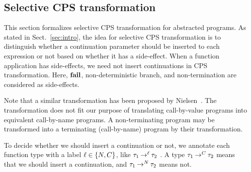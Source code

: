 \subsection{Selective CPS transformation}
\label{sec:CPS}

This section formalizes selective CPS transformation for abstracted
programs.  As stated in Sect.~\ref{sec:intro}, the idea for selective CPS
transformation is to distinguish whether a continuation parameter should
be inserted to each expression or not based on whether it has a side-effect.  When a function application has
side-effects, we need not insert continuations in CPS transformation.
Here, $\mathbf{fail}$, non-deterministic branch, and non-termination are
considered as side-effects.

Note that a similar transformation has been proposed by
Nielsen~\cite{Nielsen2001}.  The transformation does not fit our purpose
of translating call-by-value programs into equivalent call-by-name
programs.  A non-terminating program may be transformed into a
terminating (call-by-name) program by their transformation.

To decide whether we should insert a continuation or not, we
annotate each function type with a label $\ell \in \{N,C\}$, like
${\tau_1}\mathbin{\rightarrow^{\ell}}{\tau_2}$ .  A type ${\tau_1}\mathbin{\rightarrow^{C}}{\tau_2}$ means
that we should insert a continuation, and ${\tau_1}\mathbin{\rightarrow^{N}}{\tau_2}$ means
not.

